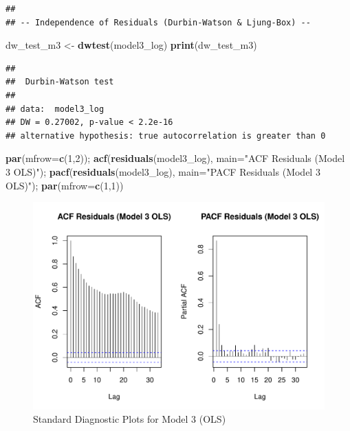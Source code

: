 \documentclass[
]{article}
\newenvironment{Shaded}{\begin{snugshade}}{\end{snugshade}}
\newcommand{\AttributeTok}[1]{\textcolor[rgb]{0.13,0.29,0.53}{#1}}
\newcommand{\DecValTok}[1]{\textcolor[rgb]{0.00,0.00,0.81}{#1}}
\newcommand{\FunctionTok}[1]{\textcolor[rgb]{0.13,0.29,0.53}{\textbf{#1}}}
\newcommand{\NormalTok}[1]{#1}
\newcommand{\OtherTok}[1]{\textcolor[rgb]{0.56,0.35,0.01}{#1}}
\newcommand{\StringTok}[1]{\textcolor[rgb]{0.31,0.60,0.02}{#1}}
\begin{document}
\begin{verbatim}
## 
## -- Independence of Residuals (Durbin-Watson & Ljung-Box) --
\end{verbatim}

\begin{Shaded}
\begin{Highlighting}[]
\NormalTok{  dw\_test\_m3 }\OtherTok{\textless{}{-}} \FunctionTok{dwtest}\NormalTok{(model3\_log)}
  \FunctionTok{print}\NormalTok{(dw\_test\_m3)}
\end{Highlighting}
\end{Shaded}

\begin{verbatim}
## 
##  Durbin-Watson test
## 
## data:  model3_log
## DW = 0.27002, p-value < 2.2e-16
## alternative hypothesis: true autocorrelation is greater than 0
\end{verbatim}

\begin{Shaded}
\begin{Highlighting}[]
  \FunctionTok{par}\NormalTok{(}\AttributeTok{mfrow=}\FunctionTok{c}\NormalTok{(}\DecValTok{1}\NormalTok{,}\DecValTok{2}\NormalTok{)); }\FunctionTok{acf}\NormalTok{(}\FunctionTok{residuals}\NormalTok{(model3\_log), }\AttributeTok{main=}\StringTok{"ACF Residuals (Model 3 OLS)"}\NormalTok{); }\FunctionTok{pacf}\NormalTok{(}\FunctionTok{residuals}\NormalTok{(model3\_log), }\AttributeTok{main=}\StringTok{"PACF Residuals (Model 3 OLS)"}\NormalTok{); }\FunctionTok{par}\NormalTok{(}\AttributeTok{mfrow=}\FunctionTok{c}\NormalTok{(}\DecValTok{1}\NormalTok{,}\DecValTok{1}\NormalTok{))}
\end{Highlighting}
\end{Shaded}

\begin{figure}
\centering
\includegraphics{FinalProject_files/figure-latex/model3-parsimonious-log-log-4.pdf}
\caption{Standard Diagnostic Plots for Model 3 (OLS)}
\end{figure}
\end{document}
